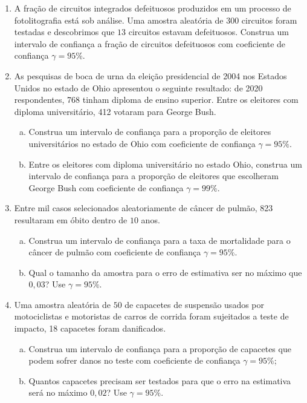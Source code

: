 \documentclass[12pt, a4paper]{article}
\begin{document}
\begin{enumerate}
	\item A fração de circuitos integrados defeituosos produzidos  em um processo de fotolitografia está sob análise. Uma amostra aleatória de $300$ circuitos foram testadas e descobrimos que $13$ circuitos estavam defeituosos. Construa um intervalo de confiança a fração de circuitos defeituosos com coeficiente de confiança $\gamma=95\%$.
	
	\item As pesquisas de boca de urna da eleição presidencial de 2004 nos Estados Unidos no estado de Ohio apresentou o seguinte resultado: de 2020 respondentes, 768 tinham diploma de ensino superior. Entre os eleitores com diploma universitário, 412 votaram para George Bush.
	\begin{enumerate}[(a)]
		\item Construa um intervalo de confiança para a proporção de eleitores universitários no estado de Ohio com coeficiente de confiança $\gamma=95\%$.
		\item Entre os eleitores com diploma universitário no estado Ohio, construa um intervalo de confiança para a proporção de eleitores que escolheram George Bush com coeficiente de confiança $\gamma=99\%$. 
	\end{enumerate}
	
	\item Entre mil casos selecionados aleatoriamente de câncer de pulmão, 823 resultaram em óbito dentro de $10$ anos. 
	\begin{enumerate}[(a)]
		\item Construa um intervalo de confiança para a taxa de mortalidade para o câncer de pulmão com coeficiente de confiança $\gamma=95\%$.
		\item Qual o tamanho da amostra para o erro de estimativa ser no máximo que $0,03$? Use $\gamma = 95\%$.
	\end{enumerate}
	
	\item Uma amostra aleatória de $50$ de capacetes de suspensão usados por motociclistas e motoristas de carros de corrida foram sujeitados a teste de impacto, 18 capacetes foram danificados.
	\begin{enumerate}[(a)]
		\item Construa um intervalo de confiança para a proporção de capacetes que podem sofrer danos no teste com coeficiente de confiança $\gamma=95\%$;
		\item Quantos capacetes precisam ser testados para que o erro na estimativa será no máximo $0,02$? Use $\gamma=95\%$.
	\end{enumerate}
\end{enumerate}
\end{document}
